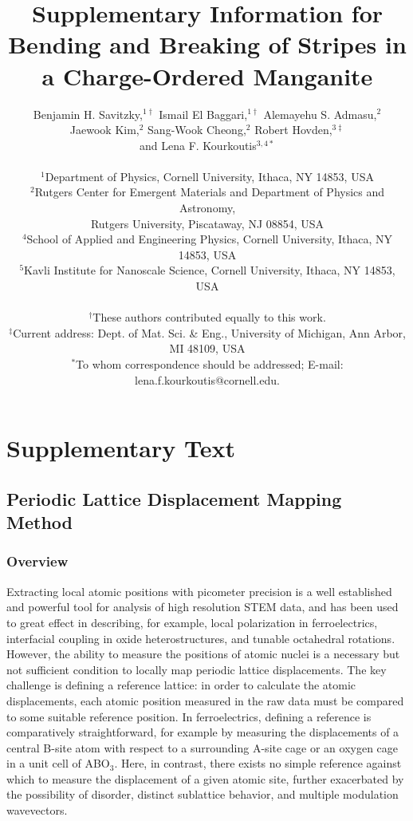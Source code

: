 \documentclass[12pt]{article}
\title{Supplementary Information for\\Bending and Breaking of Stripes in a Charge-Ordered Manganite}
\author
{Benjamin H. Savitzky,$^{1\dagger}$ Ismail El Baggari,$^{1\dagger}$ Alemayehu S. Admasu,$^{2}$\\ Jaewook Kim,$^{2}$ Sang-Wook Cheong,$^{2}$ Robert Hovden,$^{3\ddagger}$ \\and Lena F. Kourkoutis$^{3,4\ast}$\\
\\
\normalsize{$^{1}$Department of Physics, Cornell University, Ithaca, NY 14853, USA}\\
\normalsize{$^{2}$Rutgers Center for Emergent Materials and Department of Physics and Astronomy,}\\
\normalsize{Rutgers University, Piscataway, NJ 08854, USA}\\
\normalsize{$^{4}$School of Applied and Engineering Physics, Cornell University, Ithaca, NY 14853, USA}\\
\normalsize{$^{5}$Kavli Institute for Nanoscale Science, Cornell University, Ithaca, NY 14853, USA}\\
\\
\normalsize{$^\dagger$These authors contributed equally to this work.}\\
\normalsize{$^{\ddagger}$Current address: Dept. of Mat. Sci. \& Eng., University of Michigan, Ann Arbor, MI 48109, USA}\\
\normalsize{$^\ast$To whom correspondence should be addressed; E-mail:  lena.f.kourkoutis@cornell.edu.}
}
\date{}
\begin{document}
 

\maketitle
\clearpage









\section*{Supplementary Text}


\subsection*{Periodic Lattice Displacement Mapping Method}

\subsubsection*{Overview}

Extracting local atomic positions with picometer precision is a well established and powerful tool for analysis of high resolution STEM data, and has been used to great effect in describing, for example, local polarization in ferroelectrics, interfacial coupling in oxide heterostructures, and tunable octahedral rotations\cite{Jia2008,Nelson2011,Catalan2011,Tang2014,Yadav2016,Moon2014,Kan2016,Liao2016}.
However, the ability to measure the positions of atomic nuclei is a necessary but not sufficient condition to locally map periodic lattice displacements.
The key challenge is defining a reference lattice: in order to calculate the atomic displacements, each atomic position measured in the raw data must be compared to some suitable reference position.  
In ferroelectrics, defining a reference is comparatively straightforward, for example by measuring the displacements of a central B-site atom with respect to a surrounding A-site cage or an oxygen cage in a unit cell of ABO$_3$\cite{Jia2008,Nelson2011,Catalan2011,Tang2014,Yadav2016}.
Here, in contrast, there exists no simple reference against which to measure the displacement of a given atomic site, further exacerbated by the possibility of disorder, distinct sublattice behavior, and multiple modulation wavevectors.
\end{document}
